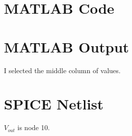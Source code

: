 \documentclass[journal]{IEEEtran}
\begin{document}
\section{MATLAB Code}
\lstset{frame=single,basicstyle=\footnotesize}


\section{MATLAB Output}
I selected the middle column of values.
\lstset{frame=single,basicstyle=\footnotesize}


\section{SPICE Netlist}
$V_{out}$ is node 10.
\lstset{frame=single,basicstyle=\footnotesize}



\ifCLASSOPTIONcaptionsoff
  \newpage
\fi





%
%
%









\end{document}
